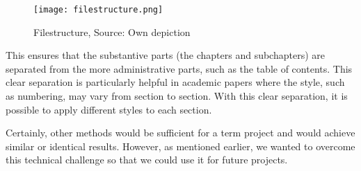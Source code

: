 \begin{figure}[H]
    \centering
    \texttt{[image: filestructure.png]}
    \caption{Filestructure, Source: Own depiction}
	\label{fig:filestructure}
\end{figure}

This ensures that the substantive parts (the chapters and subchapters) are separated from the more administrative parts, such as the table of contents. This clear separation is particularly helpful in academic papers where the style, such as numbering, may vary from section to section. With this clear separation, it is possible to apply different styles to each section.

Certainly, other methods would be sufficient for a term project and would achieve similar or identical results. However, as mentioned earlier, we wanted to overcome this technical challenge so that we could use it for future projects.